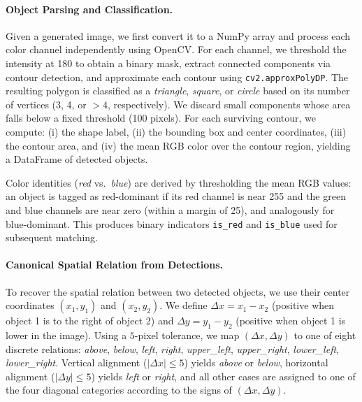 \paragraph{Object Parsing and Classification.}
Given a generated image, we first convert it to a NumPy array and process each color channel independently using OpenCV. For each channel, we threshold the intensity at 180 to obtain a binary mask, extract connected components via contour detection, and approximate each contour using \texttt{cv2.approxPolyDP}. The resulting polygon is classified as a \emph{triangle}, \emph{square}, or \emph{circle} based on its number of vertices (3, 4, or $>4$, respectively). We discard small components whose area falls below a fixed threshold (100 pixels). For each surviving contour, we compute:
(i) the shape label,
(ii) the bounding box and center coordinates,
(iii) the contour area, and
(iv) the mean RGB color over the contour region, yielding a DataFrame of detected objects.

Color identities (\emph{red} vs.\ \emph{blue}) are derived by thresholding the mean RGB values: an object is tagged as red-dominant if its red channel is near 255 and the green and blue channels are near zero (within a margin of 25), and analogously for blue-dominant. This produces binary indicators \texttt{is\_red} and \texttt{is\_blue} used for subsequent matching.

\paragraph{Canonical Spatial Relation from Detections.}
To recover the spatial relation between two detected objects, we use their center coordinates $(x_1,y_1)$ and $(x_2,y_2)$. We define
$\Delta x = x_1 - x_2$ (positive when object 1 is to the right of object 2) and
$\Delta y = y_1 - y_2$ (positive when object 1 is lower in the image).
Using a $5$-pixel tolerance, we map $(\Delta x,\Delta y)$ to one of eight discrete relations:
\emph{above}, \emph{below}, \emph{left}, \emph{right}, \emph{upper\_left}, \emph{upper\_right}, \emph{lower\_left}, \emph{lower\_right}.
Vertical alignment ($|\Delta x| \le 5$) yields \emph{above} or \emph{below}, horizontal alignment ($|\Delta y| \le 5$) yields \emph{left} or \emph{right}, and all other cases are assigned to one of the four diagonal categories according to the signs of $(\Delta x,\Delta y)$.

